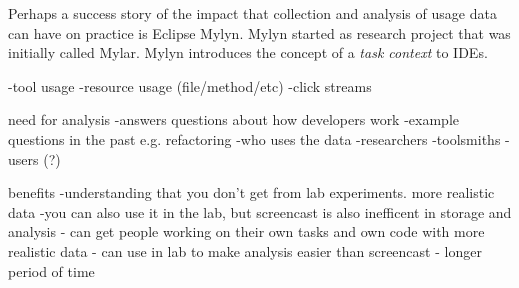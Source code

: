 Perhaps a success story of the impact that collection and analysis of usage data
can have on practice is Eclipse Mylyn. Mylyn started as research project that
was initially called Mylar. Mylyn introduces the concept of a \emph{task
context} to IDEs.


	-tool usage
	-resource usage (file/method/etc)
	-click streams

need for analysis
	-answers questions about how developers work
	-example questions in the past e.g. refactoring
	-who uses the data
		-researchers
		-toolsmiths
		-users (?)

benefits
	-understanding that you don't get from lab experiments. more realistic data
	-you can also use it in the lab, but screencast is also inefficent in storage and analysis
		- can get people working on their own tasks and own code with more realistic data
		- can use in lab to make analysis easier than screencast
		- longer period of time
